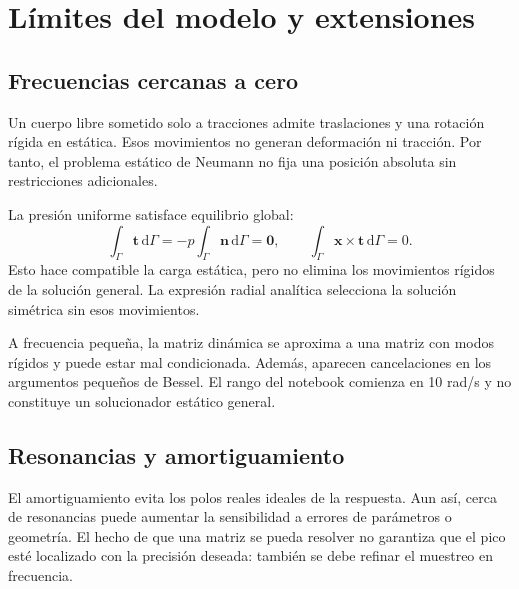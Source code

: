 \documentclass[11pt,a4paper]{report}
\numberwithin{equation}{chapter}
\newcommand{\vect}[1]{\bm{#1}}
\newcommand{\dd}{\,\mathrm{d}}
\begin{document}
\chapter{L\'imites del modelo y extensiones}
\label{ch:limites}

\section{Frecuencias cercanas a cero}
Un cuerpo libre sometido solo a tracciones admite traslaciones y una
rotaci\'on r\'igida en est\'atica. Esos movimientos no generan
deformaci\'on ni tracci\'on. Por tanto, el problema est\'atico de
Neumann no fija una posici\'on absoluta sin restricciones adicionales.

La presi\'on uniforme satisface equilibrio global:
\begin{equation}
 \int_\Gamma\vect t\dd\Gamma=-p\int_\Gamma\vect n\dd\Gamma=\vect0,
 \qquad
 \int_\Gamma\vect x\times\vect t\dd\Gamma=0.
\end{equation}
Esto hace compatible la carga est\'atica, pero no elimina los movimientos
r\'igidos de la soluci\'on general. La expresi\'on radial anal\'itica
selecciona la soluci\'on sim\'etrica sin esos movimientos.

A frecuencia peque\~na, la matriz din\'amica se aproxima a una matriz
con modos r\'igidos y puede estar mal condicionada. Adem\'as, aparecen
cancelaciones en los argumentos peque\~nos de Bessel. El rango del
notebook comienza en 10 rad/s y no constituye un solucionador est\'atico
general.

\section{Resonancias y amortiguamiento}
El amortiguamiento evita los polos reales ideales de la respuesta.
Aun as\'i, cerca de resonancias puede aumentar la sensibilidad a errores
de par\'ametros o geometr\'ia. El hecho de que una matriz se pueda
resolver no garantiza que el pico est\'e localizado con la precisi\'on
deseada: tambi\'en se debe refinar el muestreo en frecuencia.
\end{document}
